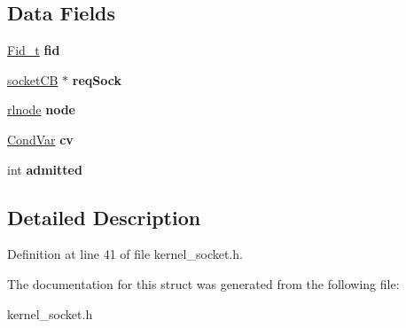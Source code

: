\subsection*{Data Fields}
\begin{DoxyCompactItemize}
\item 
\mbox{\label{structqueue__node_a559a23db13d2d55f0b1cf5f01a219356}} 
\hyperlink{group__syscalls_ga5097222c5f0da97d92d4712359abc38f}{Fid\+\_\+t} {\bfseries fid}
\item 
\mbox{\label{structqueue__node_a4abee2367e4ff1cc5d2b75916e2d2ac0}} 
\hyperlink{structsocket__control__block}{socket\+CB} $\ast$ {\bfseries req\+Sock}
\item 
\mbox{\label{structqueue__node_aa1fa93b50a7828b1f22207056d407343}} 
\hyperlink{group__rlists_ga8f6244877f7ce2322c90525217ea6e7a}{rlnode} {\bfseries node}
\item 
\mbox{\label{structqueue__node_a8a8cfae39e03622be0e56467110f2b4e}} 
\hyperlink{structCondVar}{Cond\+Var} {\bfseries cv}
\item 
\mbox{\label{structqueue__node_a7971e9268e4d313803225dfd21b35471}} 
int {\bfseries admitted}
\end{DoxyCompactItemize}


\subsection{Detailed Description}


Definition at line 41 of file kernel\+\_\+socket.\+h.



The documentation for this struct was generated from the following file\+:\begin{DoxyCompactItemize}
\item 
kernel\+\_\+socket.\+h\end{DoxyCompactItemize}
